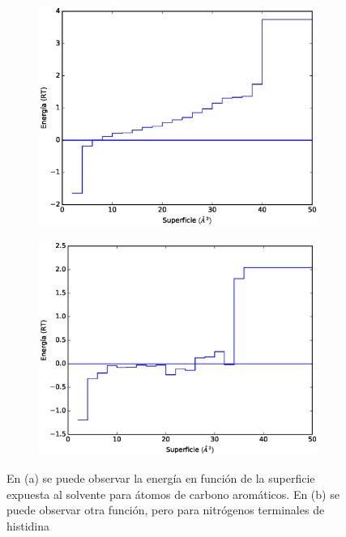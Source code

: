 \begin{figure}[p]
\centering
\begin{subfigure}{.8\textwidth}
\centering
\includegraphics[width=\textwidth]{figures/prot_pot/sasa/sasa_arom.eps}
\caption{}
\end{subfigure}
\begin{subfigure}{.8\textwidth}
\centering
\includegraphics[width=\textwidth]{figures/prot_pot/sasa/sasa_n_hist.eps}
\caption{}
\end{subfigure}
\caption[Ejemplos de funciones de energía SASA en proteínas]{En (a) se puede observar la energía en función de la superficie expuesta al solvente para átomos de carbono aromáticos. En (b) se puede observar otra función, pero para nitrógenos terminales de histidina}
\label{fig:sasapots}
\end{figure}

